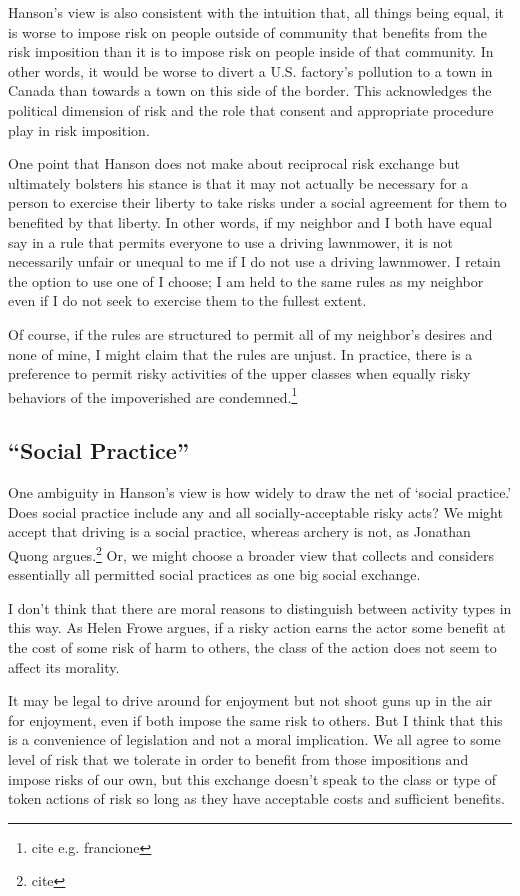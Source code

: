 Hanson’s view is also consistent with the intuition that, all things being
equal, it is worse to impose risk on people outside of community that benefits
from the risk imposition than it is to impose risk on people inside of that
community. In other words, it would be worse to divert a U.S. factory’s
pollution to a town in Canada than towards a town on this side of the border.
This acknowledges the political dimension of risk and the role that consent and
appropriate procedure play in risk imposition.

One point that Hanson does not make about reciprocal risk exchange but
ultimately bolsters his stance is that it may not actually be necessary for a
person to exercise their liberty to take risks under a social agreement for
them to benefited by that liberty. In other words, if my neighbor and I both
have equal say in a rule that permits everyone to use a driving lawnmower, it
is not necessarily unfair or unequal to me if I do not use a driving lawnmower.
I retain the option to use one of I choose; I am held to the same rules as my
neighbor even if I do not seek to exercise them to the fullest extent.

Of course, if the rules are structured to permit all of my neighbor’s desires
and none of mine, I might claim that the rules are unjust. In practice, there
is a preference to permit risky activities of the upper classes when equally
risky behaviors of the impoverished are condemned.\footnote{cite e.g. francione}

\subsection{“Social Practice”}

One ambiguity in Hanson’s view is how widely to draw the net of ‘social
practice.’ Does social practice include any and all socially-acceptable risky
acts? We might accept that driving is a social practice, whereas archery is
not, as Jonathan Quong argues.\footnote{cite} Or, we might choose a broader
view that collects and considers essentially all permitted social practices as
one big social exchange.

I don’t think that there are moral reasons to distinguish between activity
types in this way. As Helen Frowe argues, if a risky action earns the actor
some benefit at the cost of some risk of harm to others, the class of the
action does not seem to affect its morality. 

It may be legal to drive around for enjoyment but not shoot guns up in the air
for enjoyment, even if both impose the same risk to others. But I think that
this is a convenience of legislation and not a moral implication. We all agree
to some level of risk that we tolerate in order to benefit from those
impositions and impose risks of our own, but this exchange doesn’t speak to the
class or type of token actions of risk so long as they have acceptable costs
and sufficient benefits.

